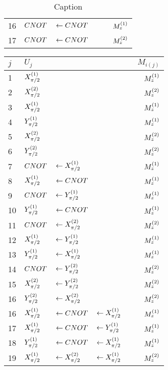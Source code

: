 \begin{appendix}
\begin{table}[htbp]
\begin{tabular}{l | l l l l|r}
            16&$CNOT $&$\leftarrow CNOT$   &&&   $M_{z}^{(1)}$ \\ 
            17&$CNOT $&$\leftarrow CNOT$   &&&   $M_{z}^{(2)}$ \\ 
             
        \end{tabular}
        \caption{Caption}
        \label{tab:sequences}
    \end{table}
    
    
  \begin{table}[htbp]
        \centering
        \begin{tabular}{l | l l l l|r} \hline 
            $j$ &$U_j$  &&&&   $M_{i(j)}$\\ \hline \hline
            1&$X_{\pi/2}^{(1)}$   &&&&   $M_{z}^{(1)}$ \\ 
            2&$X_{\pi/2}^{(2)}$   &&&&   $M_{z}^{(2)}$ \\ 
            3&$X_{\pi/2}^{(1)}$   &&&&   $M_{z}^{(1)}$ \\ 
            4&$Y_{\pi/2}^{(1)}$   &&&&   $M_{z}^{(1)}$ \\ 
            5&$X_{\pi/2}^{(2)}$   &&&&   $M_{z}^{(2)}$ \\
            6&$Y_{\pi/2}^{(2)}$   &&&&   $M_{z}^{(2)}$ \\
            7&$CNOT $&$\leftarrow X_{\pi/2}^{(1)}$   &&&   $M_{z}^{(1)}$ \\ 
            8& $X_{\pi/2}^{(1)} $&$\leftarrow CNOT$   &&&   $M_{z}^{(1)}$ \\ 
            9&$CNOT $&$\leftarrow Y_{\pi/2}^{(1)}$   &&&   $M_{z}^{(1)}$ \\ 
            10&$Y_{\pi/2}^{(1)}$&$\leftarrow CNOT$   &&&   $M_{z}^{(1)}$ \\
            11&$CNOT $&$\leftarrow X_{\pi/2}^{(2)}$    &&&   $M_{z}^{(2)}$ \\
            12&$X_{\pi/2}^{(1)} $&$\leftarrow Y_{\pi/2}^{(1)}$   &&&   $M_{z}^{(1)}$ \\
            13&$Y_{\pi/2}^{(1)} $&$\leftarrow X_{\pi/2}^{(1)}$    &&&   $M_{z}^{(1)}$ \\
            14&$CNOT $&$\leftarrow Y_{\pi/2}^{(2)}$    &&&   $M_{z}^{(2)}$ \\
            15&$X_{\pi/2}^{(2)} $&$\leftarrow Y_{\pi/2}^{(2)}$   &&&   $M_{z}^{(2)}$ \\
            16&$Y_{\pi/2}^{(2)} $&$\leftarrow X_{\pi/2}^{(2)}$    &&&   $M_{z}^{(2)}$ \\
            16&$X_{\pi/2}^{(1)} $&   $\leftarrow CNOT$ & $\leftarrow X_{\pi/2}^{(1)}$  &&   $M_{z}^{(1)}$ \\ 
            17&$X_{\pi/2}^{(1)} $&   $\leftarrow CNOT$ & $\leftarrow Y_{\pi/2}^{(1)}$  &&   $M_{z}^{(1)}$ \\  
            18&$Y_{\pi/2}^{(1)} $&   $\leftarrow CNOT$ & $\leftarrow X_{\pi/2}^{(1)}$  &&   $M_{z}^{(1)}$ \\ 
            19& $X_{\pi/2}^{(1)} $&   $\leftarrow X_{\pi/2}^{(2)}$ & $\leftarrow X_{\pi/2}^{(1)}$  &&   $M_{z}^{(2)}$ \\ 

\end{tabular}
\end{table}
\end{appendix}
